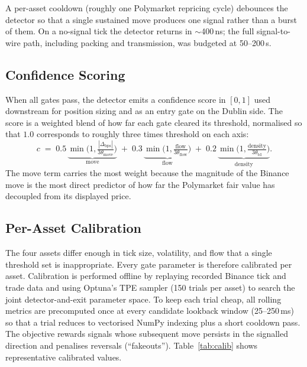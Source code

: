 \documentclass{tmsce}
\begin{document}
\noindent A per-asset cooldown (roughly one Polymarket repricing cycle) debounces
the detector so that a single sustained move produces one signal rather than a burst
of them. On a no-signal tick the detector returns in $\sim$400\,ns; the full
signal-to-wire path, including packing and transmission, was budgeted at
50--200\,\textmu s.

\subsection{Confidence Scoring}

When all gates pass, the detector emits a confidence score in $[0,1]$ used
downstream for position sizing and as an entry gate on the Dublin side. The score is
a weighted blend of how far each gate cleared its threshold, normalised so that
$1.0$ corresponds to roughly three times threshold on each axis:
\[
  c \;=\; 0.5\,\underbrace{\min\!\Big(1,\tfrac{|\Delta_{\text{bps}}|}{3\theta_{\text{move}}}\Big)}_{\text{move}}
    \;+\; 0.3\,\underbrace{\min\!\Big(1,\tfrac{\text{flow}}{3\theta_{\text{flow}}}\Big)}_{\text{flow}}
    \;+\; 0.2\,\underbrace{\min\!\Big(1,\tfrac{\text{density}}{3\theta_{\text{td}}}\Big)}_{\text{density}}.
\]
The move term carries the most weight because the magnitude of the Binance move is
the most direct predictor of how far the Polymarket fair value has decoupled from
its displayed price.

\subsection{Per-Asset Calibration}

The four assets differ enough in tick size, volatility, and flow that a single
threshold set is inappropriate. Every gate parameter is therefore calibrated
per asset. Calibration is performed offline by replaying recorded Binance tick and
trade data and using Optuna's TPE sampler (150 trials per asset) to search the joint
detector-and-exit parameter space. To keep each trial cheap, all rolling metrics are
precomputed once at every candidate lookback window (25--250\,ms) so that a trial
reduces to vectorised NumPy indexing plus a short cooldown pass. The objective
rewards signals whose subsequent move persists in the signalled direction and
penalises reversals (``fakeouts''). Table~\ref{tab:calib} shows representative
calibrated values.
\end{document}

